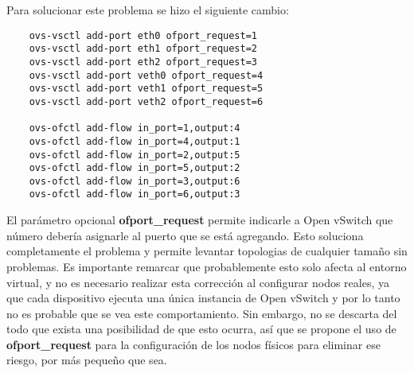 Para solucionar este problema se hizo el siguiente cambio:
\begin{lstlisting}
	ovs-vsctl add-port eth0 ofport_request=1
	ovs-vsctl add-port eth1 ofport_request=2
	ovs-vsctl add-port eth2 ofport_request=3
	ovs-vsctl add-port veth0 ofport_request=4
	ovs-vsctl add-port veth1 ofport_request=5
	ovs-vsctl add-port veth2 ofport_request=6
	
	ovs-ofctl add-flow in_port=1,output:4
	ovs-ofctl add-flow in_port=4,output:1
	ovs-ofctl add-flow in_port=2,output:5
	ovs-ofctl add-flow in_port=5,output:2
	ovs-ofctl add-flow in_port=3,output:6
	ovs-ofctl add-flow in_port=6,output:3
\end{lstlisting}
El parámetro opcional \textbf{ofport\_request} permite indicarle a Open vSwitch que número debería asignarle al puerto que se está agregando. Esto soluciona completamente el problema y permite levantar topologias de cualquier tamaño sin problemas. Es importante remarcar que probablemente esto solo afecta al entorno virtual, y no es necesario realizar esta corrección al configurar nodos reales, ya que cada dispositivo ejecuta una única instancia de Open vSwitch y por lo tanto no es probable que se vea este comportamiento. Sin embargo, no se descarta del todo que exista una posibilidad de que esto ocurra, así que se propone el uso de \textbf{ofport\_request} para la configuración de los nodos físicos para eliminar ese riesgo, por más pequeño que sea.

